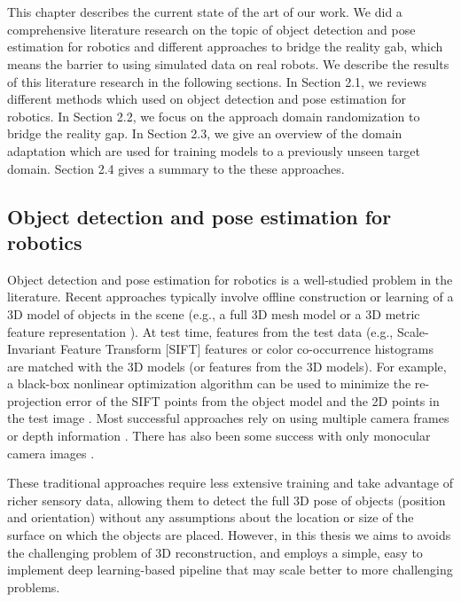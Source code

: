 \chapter{}
\label{sec:state_of_the_art}
This chapter describes the current state of the art of our work. We did a comprehensive literature research on the topic of object detection and pose estimation for robotics and different approaches to bridge the reality gab, which means the barrier to using simulated data on real robots. We describe the results of this literature research in the following sections. In Section 2.1, we reviews different methods which used on object detection and pose estimation for robotics. In Section 2.2, we focus on the approach domain randomization to bridge the reality gap. In Section 2.3, we give an overview of the domain adaptation which are used for training models to a previously unseen target domain.  Section 2.4 gives a summary to the these approaches.

\section{Object detection and pose estimation for robotics}
Object detection and pose estimation for robotics is a well-studied problem in the literature. Recent approaches typically involve offline construction or learning of a 3D model of objects in the scene (e.g., a full 3D mesh model \cite{tang2012textured} or a 3D metric feature representation \cite{collet2011moped}). At test time, features from the test data (e.g., Scale-Invariant Feature Transform [SIFT] features \cite{gordon2006and} or color co-occurrence histograms \cite{ekvall2005object} are matched with the 3D models (or features from the 3D models). For example, a black-box nonlinear optimization algorithm can be used to minimize the re-projection error of the SIFT points from the object model and the 2D points in the test image \cite{collet2009object}. Most successful approaches rely on using multiple camera frames \cite{collet2010efficient} or depth information \cite{tang2012textured}. There has also been some success with only monocular camera images \cite{collet2009object}.

These traditional approaches require less extensive training and take advantage of richer sensory data, allowing them to detect the full 3D pose of objects (position and orientation) without any assumptions about the location or size of the surface on which the objects are placed. However, in this thesis we aims to avoids the challenging problem of 3D reconstruction, and employs a simple, easy to implement deep learning-based pipeline that may scale better to more challenging problems.

